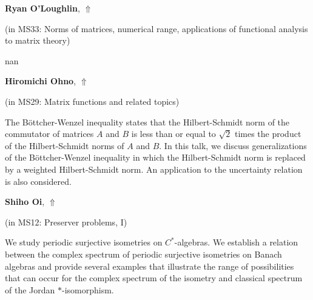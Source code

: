 \documentclass[ILAS2025-program.tex]{subfiles}
\begin{document}
     \hypertarget{down0277}{}\begin{ilasabstract}
    
    \textbf{Ryan O'Loughlin},  \hfill \hyperlink{up0277}{$\Uparrow$}
    
    (in {\color{mstitle}MS33: Norms of matrices, numerical range, applications of functional analysis to matrix theory})
        
        \mtskip
    nan\end{ilasabstract}
     \hypertarget{down0014}{}\begin{ilasabstract}
    
    \textbf{Hiromichi Ohno},  \hfill \hyperlink{up0014}{$\Uparrow$}
    
    (in {\color{mstitle}MS29: Matrix functions and related topics})
        
        \mtskip
    The B\"ottcher-Wenzel inequality states that the Hilbert-Schmidt norm of the commutator of matrices $A$ and $B$ is less than or equal to $\sqrt{2}$ times the product of the Hilbert-Schmidt norms of $A$ and $B$. In this talk, we discuss generalizations of the B\"ottcher-Wenzel inequality in which the Hilbert-Schmidt norm is replaced by a weighted Hilbert-Schmidt norm. An application to the uncertainty relation is also considered.\end{ilasabstract}
     \hypertarget{down0163}{}\begin{ilasabstract}
    
    \textbf{Shiho Oi},  \hfill \hyperlink{up0163}{$\Uparrow$}
    
    (in {\color{mstitle}MS12: Preserver problems, I})
        
        \mtskip
    We study periodic surjective isometries on $C^{*}$-algebras.  We establish a relation between the complex spectrum of periodic surjective isometries on Banach algebras  and provide several examples that illustrate the range of possibilities that can occur for the complex spectrum of the isometry and classical spectrum of the Jordan $\ast$-isomorphism.
\end{ilasabstract}
\end{document}
